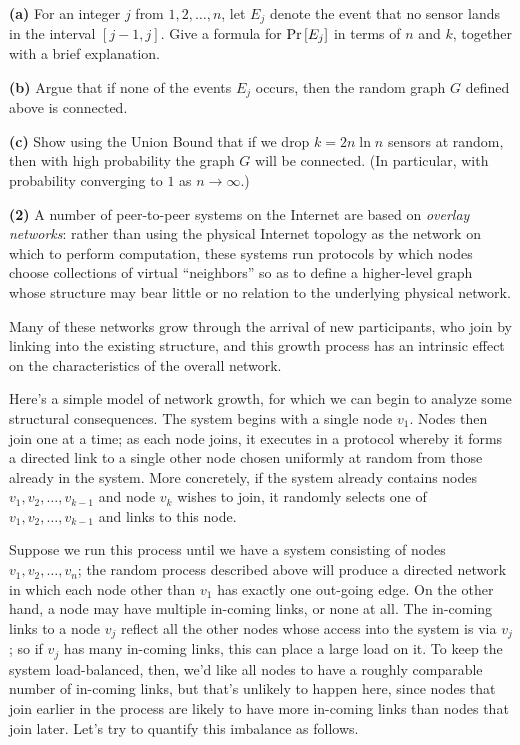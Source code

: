 \documentclass[12pt]{article}
\def\Prf{{\rm Pr}}
\newcommand{\Prb}[1]{
\Prf\left[{#1}\right]
}
\begin{document}
\gap
{\bf (a)} For an integer $j$ from $1, 2, \ldots, n$, let $E_j$
denote the event that no sensor lands in the interval $[j-1,j]$.
Give a formula for $\Prb{E_{j}}$ in terms of $n$ and $k$, together
with a brief explanation.

\gap
{\bf (b)} Argue that if none of the events
$E_j$ occurs, then the random graph $G$ defined above is connected.

\gap
{\bf (c)} Show using the Union Bound
that if we drop $k = 2 n \ln n$ sensors at random,
then with high probability the graph $G$ will be connected.
(In particular, with probability converging to $1$ as $n \rightarrow \infty$.)


\scenebreak

{\bf (2)}
A number of peer-to-peer systems on the Internet
are based on {\em overlay networks}:
rather than using the physical Internet topology
as the network on which to perform computation,
these systems run protocols by which nodes choose
collections of virtual ``neighbors'' so as to
define a higher-level graph 
whose structure may bear little or no relation to
the underlying physical network.

Many of these networks grow through the arrival of new participants,
who join by linking into the existing structure, and
this growth process has an intrinsic effect on the characteristics
of the overall network.

Here's a simple model of network growth, for which 
we can begin to analyze some structural consequences.
The system begins with a single node $v_1$.
Nodes then join one at a time; as each node joins, it executes
in a protocol whereby it forms a directed link to a single other node
chosen uniformly at random from those already in the system.
More concretely, if the system already contains nodes
$v_1, v_2, \ldots, v_{k-1}$ and node $v_k$ wishes to join,
it randomly selects one of $v_1, v_2, \ldots, v_{k-1}$
and links to this node.

Suppose we run this process until we have a system
consisting of nodes $v_1, v_2, \ldots, v_n$;
the random process described above will produce
a directed network in which each
node other than $v_1$ has exactly one out-going edge.
On the other hand, a node may have multiple
in-coming links, or none at all.
The in-coming links to a node $v_j$
reflect all the other nodes whose access into
the system is via $v_j$; so if $v_j$ has many
in-coming links, this can place a large load on it.
To keep the system load-balanced, then, we'd like all nodes to have a
roughly comparable number of in-coming links,
but that's unlikely to happen here,
since nodes that join earlier in the process are likely to have
more in-coming links than nodes that join later.
Let's try to quantify this imbalance as follows.
\end{document}
